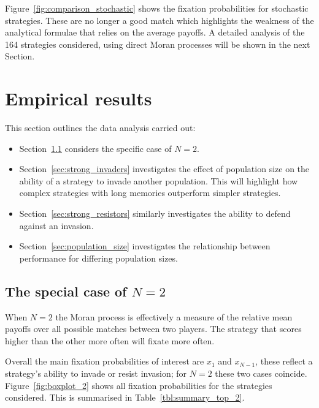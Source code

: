 \documentclass{article}
\begin{document}
Figure~\ref{fig:comparison_stochastic} shows the fixation probabilities for
stochastic strategies. These are no longer a good match which highlights the
weakness of the analytical formulae that relies on the average payoffs. A
detailed analysis of the 164 strategies considered, using direct Moran processes
will be shown in the next Section.


\section{Empirical results}\label{sec:empirical_results}


This section outlines the data analysis carried out:

\begin{itemize}
    \item Section~\ref{sec:two_individuals} considers the specific case of
        \(N=2\).
    \item Section~\ref{sec:strong_invaders} investigates the effect of
        population size on the ability of a strategy to invade another
        population. This will highlight how complex strategies with long
        memories outperform simpler strategies.
    \item Section~\ref{sec:strong_resistors} similarly investigates the
        ability to defend against an invasion.
    \item Section~\ref{sec:population_size} investigates the relationship
        between performance for differing population sizes.
\end{itemize}

\subsection{The special case of \(N=2\)}\label{sec:two_individuals}

When $N=2$ the Moran process is effectively a measure of the relative
mean payoffs over all possible matches between two players. The strategy
that scores higher than the other more often will fixate more often.

Overall the main fixation probabilities of interest are \(x_1\) and \(x_{N-1}\),
these reflect a strategy's ability to invade or resist invasion; for \(N=2\)
these two cases coincide. Figure~\ref{fig:boxplot_2} shows all fixation
probabilities for the strategies considered. This is summarised in
Table~\ref{tbl:summary_top_2}.
\end{document}
